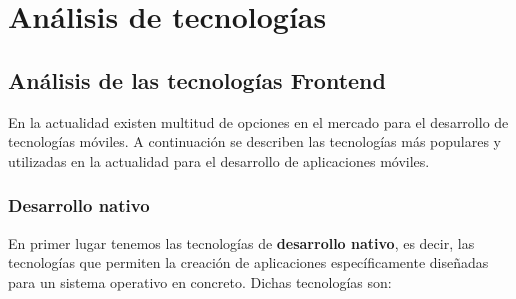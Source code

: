 \chapter{Análisis de tecnologías}
\label{cap:analisis_tecnologias}




\section{Análisis de las tecnologías Frontend}
\label{sec:frontend}
En la actualidad existen multitud de opciones en el mercado para el desarrollo de tecnologías móviles. A continuación se describen las tecnologías más populares y utilizadas en la actualidad para el desarrollo de aplicaciones móviles.

\subsection{Desarrollo nativo}
\label{subsec:nativo}
En primer lugar tenemos las tecnologías de \textbf{desarrollo nativo}, es decir, las tecnologías que permiten la creación de aplicaciones específicamente diseñadas
para un sistema operativo en concreto. Dichas tecnologías son: 

